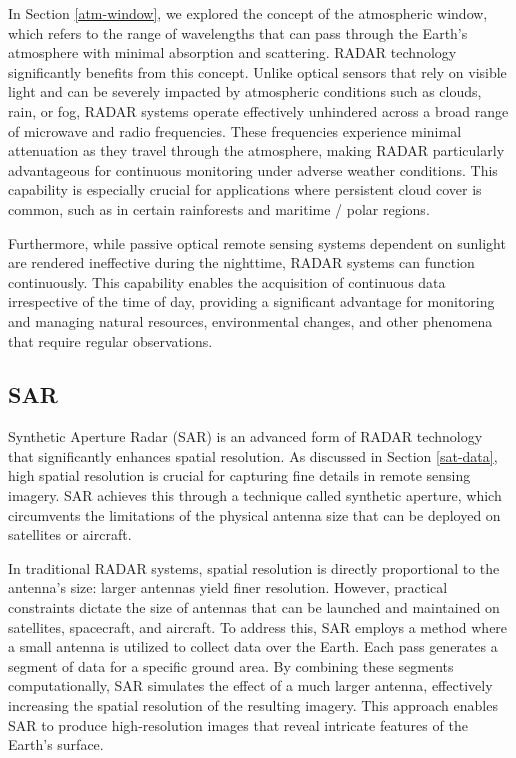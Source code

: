 \documentclass[
  12 pt,
]{Nemilov}
\begin{document}
In Section \ref{atm-window}, we explored the concept of the atmospheric window, which refers to the range of wavelengths that can pass through the Earth's atmosphere with minimal absorption and scattering. RADAR technology significantly benefits from this concept. Unlike optical sensors that rely on visible light and can be severely impacted by atmospheric conditions such as clouds, rain, or fog, RADAR systems operate effectively unhindered across a broad range of microwave and radio frequencies. These frequencies experience minimal attenuation as they travel through the atmosphere, making RADAR particularly advantageous for continuous monitoring under adverse weather conditions. This capability is especially crucial for applications where persistent cloud cover is common, such as in certain rainforests and maritime / polar regions.

Furthermore, while passive optical remote sensing systems dependent on sunlight are rendered ineffective during the nighttime, RADAR systems can function continuously. This capability enables the acquisition of continuous data irrespective of the time of day, providing a significant advantage for monitoring and managing natural resources, environmental changes, and other phenomena that require regular observations.

\subsection{SAR}\label{sar}

Synthetic Aperture Radar (SAR) is an advanced form of RADAR technology that significantly enhances spatial resolution. As discussed in Section \ref{sat-data}, high spatial resolution is crucial for capturing fine details in remote sensing imagery. SAR achieves this through a technique called synthetic aperture, which circumvents the limitations of the physical antenna size that can be deployed on satellites or aircraft.

In traditional RADAR systems, spatial resolution is directly proportional to the antenna's size: larger antennas yield finer resolution. However, practical constraints dictate the size of antennas that can be launched and maintained on satellites, spacecraft, and aircraft. To address this, SAR employs a method where a small antenna is utilized to collect data over the Earth. Each pass generates a segment of data for a specific ground area. By combining these segments computationally, SAR simulates the effect of a much larger antenna, effectively increasing the spatial resolution of the resulting imagery. This approach enables SAR to produce high-resolution images that reveal intricate features of the Earth's surface.
\end{document}
